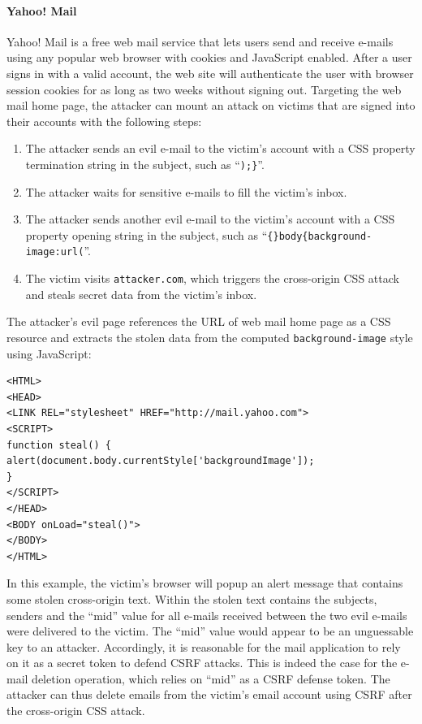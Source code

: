 \documentclass{acm_proc_article-sp}
\begin{document}
\paragraph{Yahoo! Mail} Yahoo! Mail is a free web mail service that lets users send and receive e-mails using any popular web browser with cookies and JavaScript enabled. After a user signs in with a valid account, the web site will authenticate the user with browser session cookies for as long as two weeks without signing out. Targeting the web mail home page, the attacker can mount an attack on victims that are signed into their accounts with the following steps:
\begin{enumerate}
\item{The attacker sends an evil e-mail to the victim's account with a CSS property termination string in the subject, such as ``\texttt{);\}}''.}
\item{The attacker waits for sensitive e-mails to fill the victim's inbox.}
\item{The attacker sends another evil e-mail to the victim's account with a CSS property opening string in the subject, such as ``\texttt{\{\}body\{background-image:url(}''.}
\item{The victim visits \texttt{attacker.com}, which triggers the cross-origin CSS attack and steals secret data from the victim's inbox.}
\end{enumerate}
The attacker's evil page references the URL of web mail home page as a CSS resource and extracts the stolen data from the computed \texttt{background-image} style using JavaScript:
\begin{verbatim}
<HTML>
<HEAD>
<LINK REL="stylesheet" HREF="http://mail.yahoo.com">
<SCRIPT>
function steal() {
alert(document.body.currentStyle['backgroundImage']);
}
</SCRIPT>
</HEAD>
<BODY onLoad="steal()">
</BODY>
</HTML>
\end{verbatim}
In this example, the victim's browser will popup an alert message that contains some stolen cross-origin text. Within the stolen text contains the subjects, senders and the ``mid'' value for all e-mails received between the two evil e-mails were delivered to the victim. The ``mid'' value would appear to be an unguessable key to an attacker. Accordingly, it is reasonable for the mail application to rely on it as a secret token to defend CSRF attacks. This is indeed the case for the e-mail deletion operation, which relies on ``mid'' as a CSRF defense token. The attacker can thus delete emails from the victim's email account using CSRF after the cross-origin CSS attack.
\end{document}
